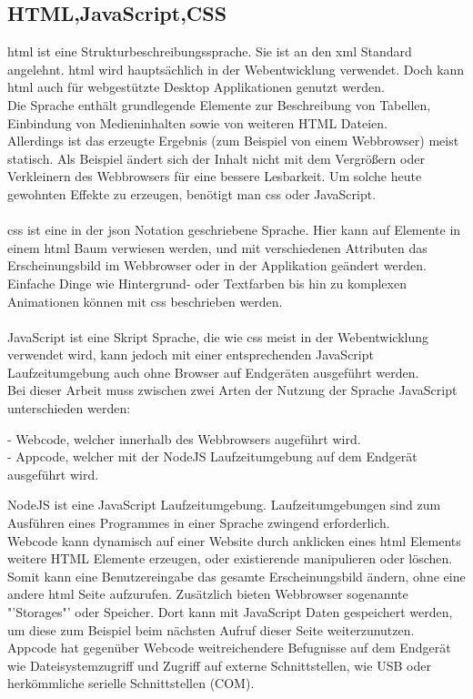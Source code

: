 \documentclass[11pt]{scrartcl}
\begin{document}
\subsection{HTML,JavaScript,CSS}
\ac{html} ist eine Strukturbeschreibungssprache. Sie ist an den \ac{xml} Standard angelehnt. \ac{html}
wird hauptsächlich in der Webentwicklung verwendet. Doch kann \ac{html} auch für webgestützte Desktop
Applikationen genutzt werden.\\
Die Sprache enthält grundlegende Elemente zur Beschreibung von Tabellen, Einbindung von Medieninhalten sowie
von weiteren HTML Dateien.\\
Allerdings ist das erzeugte Ergebnis (zum Beispiel von einem Webbrowser) meist statisch. Als Beispiel ändert sich
der Inhalt nicht mit dem Vergrößern oder Verkleinern des Webbrowsers für eine bessere Lesbarkeit. Um solche heute
gewohnten Effekte zu erzeugen, benötigt man \ac{css} oder JavaScript.\\
\\
\ac{css} ist eine in der \ac{json} Notation geschriebene Sprache. Hier kann auf Elemente in einem \ac{html} Baum
verwiesen werden, und mit verschiedenen Attributen das Erscheinungsbild im Webbrowser oder in der Applikation
geändert werden.\\
Einfache Dinge wie Hintergrund- oder Textfarben bis hin zu komplexen Animationen können mit \ac{css} beschrieben
werden.\\
\\
JavaScript ist eine Skript Sprache, die wie \ac{css} meist in der Webentwicklung verwendet wird, kann jedoch
mit einer entsprechenden JavaScript Laufzeitumgebung auch ohne Browser auf Endgeräten ausgeführt werden.\\
Bei dieser Arbeit muss zwischen zwei Arten der Nutzung der Sprache JavaScript unterschieden werden:\\
\begin{addmargin}[2em]{0em}
 - Webcode, welcher innerhalb des Webbrowsers augeführt wird.\\
 - Appcode, welcher mit der NodeJS Laufzeitumgebung auf dem Endgerät ausgeführt wird.\\
\end{addmargin}
NodeJS ist eine JavaScript Laufzeitumgebung. Laufzeitumgebungen sind zum Ausführen eines Programmes in einer
Sprache zwingend erforderlich.\\
Webcode kann dynamisch auf einer Website durch anklicken eines \ac{html} Elements weitere HTML Elemente erzeugen,
oder existierende manipulieren oder löschen. Somit kann eine Benutzereingabe das gesamte Erscheinungsbild ändern,
ohne eine andere \ac{html} Seite aufzurufen.
Zusätzlich bieten Webbrowser sogenannte "'Storages"' oder Speicher. Dort kann mit JavaScript Daten gespeichert werden,
um diese zum Beispiel beim nächsten Aufruf dieser Seite weiterzunutzen.\\
Appcode hat gegenüber Webcode weitreichendere Befugnisse auf dem Endgerät wie Dateisystemzugriff und Zugriff auf
externe Schnittstellen, wie USB oder herkömmliche serielle Schnittstellen (COM).
\clearpage
\end{document}
